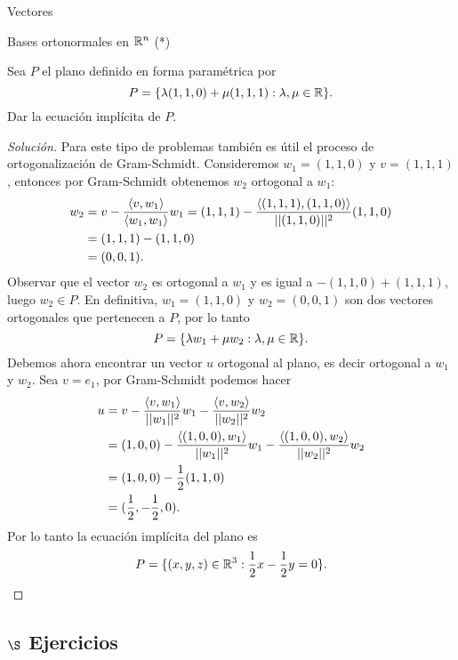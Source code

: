 \begin{chapter}{Vectores}
\begin{section}{Bases ortonormales en $\mathbb R^n$ (*)}
\begin{ejemplo*}
    Sea $P$ el plano definido en forma paramétrica por 
    \begin{equation*}
        P = \{\lambda(1,1,0) + \mu(1,1,1): \lambda, \mu \in \mathbb R\}.
    \end{equation*}
    Dar la ecuación implícita de $P$.
\end{ejemplo*}
\begin{proof}[Solución]
    Para  este tipo de problemas también es útil el proceso de ortogonalización de Gram-Schmidt. Consideremos $w_1 = (1,1,0)$ y $v =(1,1,1)$,  entonces por Gram-Schmidt obtenemos $w_2$ ortogonal a $w_1$:
    \begin{align*}
        w_2 &= v - \frac{\langle v,w_1\rangle}{\langle w_1,w_1\rangle}w_1  = (1,1,1) - \frac{\langle (1,1,1),(1,1,0)\rangle}{||(1,1,0)||^2}(1,1,0) \\
        &=  (1,1,1) - (1,1,0) \\
        &=(0,0,1).
    \end{align*}
    Observar que el vector $w_2$ es ortogonal a $w_1$ y  es igual a  $ - (1,1,0) + (1,1,1)$, luego $w_2 \in P$. En definitiva, $w_1 = (1,1,0)$ y $w_2=(0,0,1)$ son dos vectores ortogonales que pertenecen a $P$, por lo tanto 
    \begin{equation*}
        P = \{\lambda w_1 + \mu w_2: \lambda, \mu \in \mathbb R\}.
    \end{equation*}
    Debemos ahora encontrar un vector $u$ ortogonal al plano,  es decir ortogonal a $w_1$ y $w_2$. Sea $v =e_1$, por Gram-Schmidt podemos hacer
    \begin{align*}
        u&= v - \frac{\langle v,w_1\rangle}{||w_1||^2}w_1- \frac{\langle v,w_2\rangle}{||w_2||^2}w_2 \\
        &= (1,0,0) - \frac{\langle (1,0,0),w_1\rangle}{||w_1||^2}w_1- \frac{\langle (1,0,0), w_2\rangle}{||w_2||^2} w_2\\
        &= (1,0,0) - \frac{1}{2}(1,1,0)  \\
        &= (\frac{1}{2},-\frac{1}{2},0).
       \end{align*}
      Por lo tanto  la ecuación implícita del plano es
      \begin{equation*}
        P = \{(x,y,z)\in \mathbb R^3: \frac{1}{2}x-\frac{1}{2}y =0\}.
      \end{equation*}
\end{proof}

\subsection*{$\S$ Ejercicios}


\end{section}
\end{chapter}
